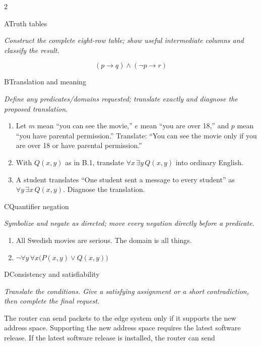 \documentclass[9pt]{extarticle}
\begin{document}
\CoreWorkArea
\FormBreak
{}
\begin{multicols}{2}
\begin{CoreProblem}{A}{Truth tables}
{\scriptsize\textit{Construct the complete eight-row table; show useful intermediate columns and classify the result.}\par}
\[
  (p\to q)\land(\neg p\to r)
\]
\end{CoreProblem}
\begin{CoreProblem}{B}{Translation and meaning}
{\scriptsize\textit{Define any predicates/domains requested; translate exactly and diagnose the proposed translation.}\par}
\begin{enumerate}[label=(\alph*)]
  \item Let $m$ mean ``you can see the movie,'' $e$ mean ``you are over 18,''
        and $p$ mean ``you have parental permission.'' Translate: ``You can
        see the movie only if you are over 18 or have parental permission.''
  \item With $Q(x,y)$ as in B.1, translate $\forall x\,\exists y\,Q(x,y)$
        into ordinary English.
  \item A student translates ``One student sent a message to every student''
        as $\forall y\,\exists x\,Q(x,y)$. Diagnose the translation.
\end{enumerate}
\end{CoreProblem}
\begin{CoreProblem}{C}{Quantifier negation}
{\scriptsize\textit{Symbolize and negate as directed; move every negation directly before a predicate.}\par}
\begin{enumerate}[label=(\alph*)]
  \item All Swedish movies are serious. The domain is all things.
  \item $\neg\forall y\,\forall x\bigl(P(x,y)\lor Q(x,y)\bigr)$
\end{enumerate}
\end{CoreProblem}
\columnbreak
\begin{CoreProblem}{D}{Consistency and satisfiability}
{\scriptsize\textit{Translate the conditions. Give a satisfying assignment or a short contradiction, then complete the final request.}\par}
The router can send packets to the edge system only if it supports the new
address space. Supporting the new address space requires the latest software
release. If the latest software release is installed, the router can send

\end{CoreProblem}
\end{multicols}
\end{document}
